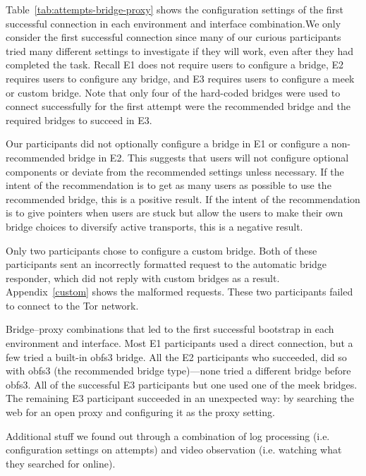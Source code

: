 \documentclass[USenglish,oneside,twocolumn]{article}
\begin{document}
{Table~\ref{tab:attempts-bridge-proxy} shows the configuration settings of the first successful connection in each environment and interface combination.We only consider the first successful connection since many of our curious participants tried many different settings to investigate if they will work, even after they had completed the task. Recall E1 does not require users to configure a bridge, E2 requires users to configure any bridge, and E3 requires users to configure a meek or custom bridge. Note that only four of the hard-coded bridges were used to connect successfully for the first attempt were the recommended bridge and the required bridges to succeed in E3.

Our participants did not optionally configure a bridge in E1 or configure a non-recommended bridge in E2. This suggests that users will not configure optional components or deviate from the recommended settings unless necessary. If the intent of the recommendation is to get as many users as possible to use the recommended bridge, this is a positive result. If the intent of the recommendation is to give pointers when users are stuck but allow the users to make their own bridge choices to diversify active transports, this is a negative result. 

Only two participants chose to configure a custom bridge. Both of these participants sent an incorrectly formatted request to the automatic bridge responder, which did not reply with custom bridges as a result. Appendix~\ref{custom} shows the malformed requests. These two participants failed to connect to the Tor network. 

\begin{table}
\centering

\caption{
Bridge--proxy combinations that led to the first successful bootstrap
in each environment and interface.
Most E1 participants used a direct connection,
but a few tried a built-in obfs3 bridge.
All the E2 participants who succeeded,
did so with obfs3 (the recommended bridge type)---none tried
a different bridge before obfs3.
All of the successful E3 participants but one
used one of the meek bridges.
The remaining E3 participant succeeded in an unexpected way:
by searching the web for an open proxy and configuring it
as the proxy setting.
}
\label{tab:attempts-bridge-proxy}
\end{table}

{\color {red} 
Additional stuff we found out through a combination of log processing (i.e. configuration settings on attempts) and video observation (i.e. watching what they searched for online).

}}
\end{document}
